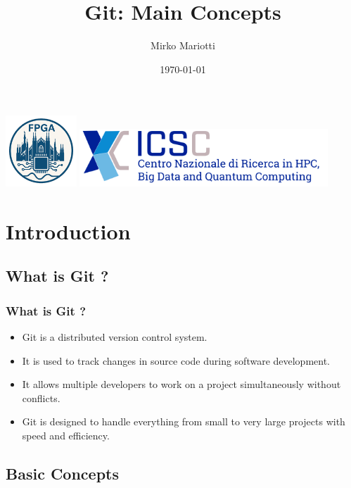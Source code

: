 \documentclass{beamer}
\begin{document}
\title[\today]{Git: Main Concepts}
\author{Mirko Mariotti}
\date{\today}

\begin{frame}
{
    \includegraphics[width=0.2\textwidth]{mi.png}  
    \hfill
    \includegraphics[width=0.7\textwidth]{iscs.png}
}
\titlepage
\end{frame}


\section{Introduction}

\subsection{What is Git ?}

\begin{frame}\frametitle{What is Git ?}
\begin{itemize}
	\item Git is a distributed version control system.
	\item It is used to track changes in source code during software development.
	\item It allows multiple developers to work on a project simultaneously without conflicts.
	\item Git is designed to handle everything from small to very large projects with speed and efficiency.
\end{itemize}
\end{frame}

\subsection{Basic Concepts}
\end{document}
